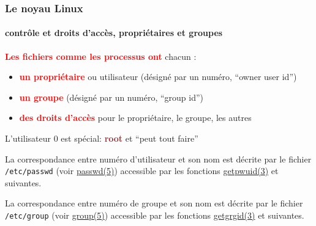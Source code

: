\documentclass[xcolor=svgnames,final,smaller,a4]{beamer}
\begin{document}
\begin{frame}
  \frametitle{Le noyau Linux}
  \framesubtitle{contrôle et droits d'accès, propriétaires et groupes}

   \textbf{\textcolor{red}{Les fichiers comme les processus ont}} chacun :

  \begin{itemize}

  \item \textbf{\textcolor{red}{un propriétaire}} ou utilisateur (désigné par un numéro, ``owner user id'')

  \item \textbf{\textcolor{red}{un groupe}} (désigné par un numéro, ``group id'')

  \item \textbf{\textcolor{red}{des droits d'accès}} pour le propriétaire, le groupe, les autres

  \end{itemize}

  L'utilisateur 0 est spécial: \textbf{\textcolor{brown}{root}} et ``peut tout faire''

\vspace{0.5cm}

  La correspondance entre numéro d'utilisateur et son nom est décrite
  par le fichier \texttt{/etc/passwd} (voir
  \href{https://man7.org/linux/man-pages/man5/passwd.5.html}{passwd(5)})
  accessible par les fonctions
  \href{https://man7.org/linux/man-pages/man3/getpwuid.3.html}{getpwuid(3)}
  et suivantes.
  
  La correspondance entre numéro de groupe et son nom est décrite
  par le fichier \texttt{/etc/group} (voir
  \href{https://man7.org/linux/man-pages/man5/group.5.html}{group(5)})
  accessible par les fonctions
  \href{https://man7.org/linux/man-pages/man3/getgrgid.3.html}{getgrgid(3)}
  et suivantes.
  
\end{frame}
\end{document}

